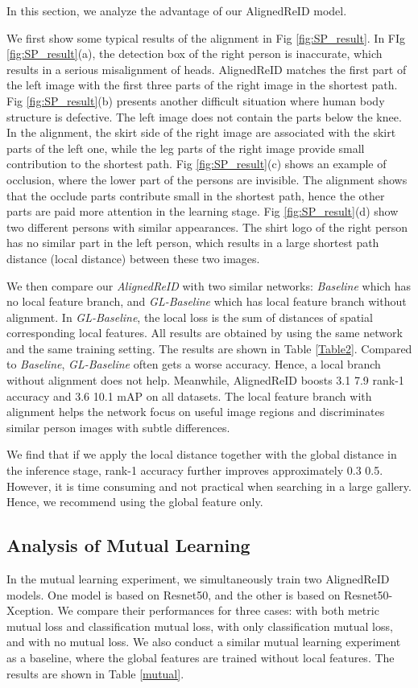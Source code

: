 \documentclass[10pt,twocolumn,letterpaper]{article}
\begin{document}
In this section, we analyze the advantage of our AlignedReID model.

We first show some typical results of the alignment in Fig \ref{fig:SP_result}.
In FIg \ref{fig:SP_result}(a), the detection box of the right person is inaccurate, which results in a serious misalignment of heads.
AlignedReID matches the first part of the left image with the first three parts of the right image in the shortest path.
Fig \ref{fig:SP_result}(b) presents another difficult situation where human body structure is defective.
The left image does not contain the parts below the knee.
In the alignment, the skirt side of the right image are associated with the skirt parts of the left one,
while the leg parts of the right image provide small contribution to the shortest path.
Fig \ref{fig:SP_result}(c) shows an example of occlusion, where the lower part of the persons are invisible.
The alignment shows that the occlude parts contribute small in the shortest path, hence the other parts are paid more attention in the learning stage.
Fig \ref{fig:SP_result}(d) show two different persons with similar appearances.
The shirt logo of the right person has no similar part in the left person, which results in a large shortest path distance (local distance) between these two images.

We then compare our \emph{AlignedReID} with two similar networks:
\emph{Baseline} which has no local feature branch, and \emph{GL-Baseline} which has local feature branch without alignment.
In \emph{GL-Baseline}, the local loss is the sum of distances of spatial corresponding local features.
All results are obtained by using the same network and the same training setting. 
The results are shown in Table \ref{Table2}.
Compared to \emph{Baseline}, \emph{GL-Baseline} often gets a worse accuracy. Hence, a local branch without alignment does not help.
Meanwhile, AlignedReID boosts 3.1 7.9 rank-1 accuracy and 3.6 10.1 mAP on all datasets.
The local feature branch with alignment helps the network focus on useful image regions and discriminates similar person images with subtle differences.

We find that if we apply the local distance together with the global distance in the inference stage,
rank-1 accuracy further improves approximately 0.3 0.5. However, it is time consuming and not practical when searching in a large gallery. Hence, we recommend using the global feature only.


\subsection{Analysis of Mutual Learning}
In the mutual learning experiment, we simultaneously train two AlignedReID models.
One model is based on Resnet50, and the other is based on Resnet50-Xception.
We compare their performances for three cases: with both metric mutual loss and classification mutual loss, with only classification mutual loss, and with no mutual loss.
We also conduct a similar mutual learning experiment as a baseline, where the global features are trained without local features. The results are shown in Table \ref{mutual}.
\end{document}
